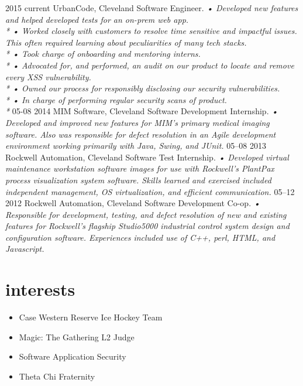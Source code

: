 \documentclass[]{friggeri-cv}
\begin{document}
\begin{entrylist}
  \entry
    {2015 current}
    {UrbanCode, Cleveland}
    {Software Engineer.}
    {\emph{
    •	Developed new features and helped developed tests for an on-prem web app.\\*
    •	Worked closely with customers to resolve time sensitive and impactful issues. This often required learning about peculiarities of many tech stacks.\\*
    •	Took charge of onboarding and mentoring interns. \\*
    •	Advocated for, and performed, an audit on our product to locate and remove every XSS vulnerability.\\*
    •	Owned our process for responsibly disclosing our security vulnerabilities.\\*
    •	In charge of performing regular security scans of product.\\*
}}
  \entry
    {05-08 2014}
    {MIM Software, Cleveland}
    {Software Development Internship.}
    {\emph{
    •	Developed and improved new features for MIM's primary medical imaging software. Also was responsible for defect resolution in an Agile development environment working primarily with Java, Swing, and JUnit.}}
  \entry
    {05–08 2013}
    {Rockwell Automation, Cleveland}
    {Software Test Internship.}
    {\emph{
    •	Developed virtual maintenance workstation software images for use with Rockwell’s PlantPax process visualization system software. Skills learned and exercised included independent management, OS virtualization, and efficient communication.}}
  \entry
    {05–12 2012}
    {Rockwell Automation, Cleveland}
    {Software Development Co-op.}
    {\emph{
    •	Responsible for development, testing, and defect resolution of new and existing features for Rockwell’s flagship Studio5000 industrial control system design and configuration software.  Experiences included use of C++, perl, HTML, and Javascript.}}
\end{entrylist}

\section{interests}

\begin{itemize}
  \item Case Western Reserve Ice Hockey Team
  \item Magic: The Gathering L2 Judge
  \item Software Application Security
  \item Theta Chi Fraternity
\end{itemize}
\end{document}
